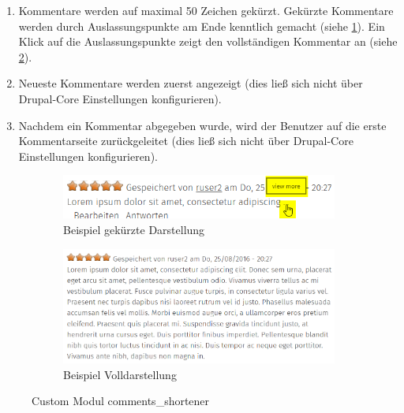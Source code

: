 \begin{enumerate}
	\item Kommentare werden auf maximal 50 Zeichen gekürzt. Gekürzte Kommentare werden durch Auslassungspunkte am Ende kenntlich gemacht (siehe \cref{fig:example_commentshortener_short}). Ein Klick auf die Auslassungspunkte zeigt den vollständigen Kommentar an (siehe \cref{fig:example_commentshortener_full}).

	\item Neueste Kommentare werden zuerst angezeigt (dies ließ sich nicht über Drupal-Core Einstellungen konfigurieren).

	\item Nachdem ein Kommentar abgegeben wurde, wird der Benutzer auf die erste Kommentarseite zurückgeleitet (dies ließ sich nicht über Drupal-Core Einstellungen konfigurieren).
\end{enumerate}

\begin{figure}[H]
	\centering
	\begin{subfigure}[b]{0.45\textwidth}
		\centering
		\includegraphics[width=0.95\linewidth]{images/example_commentsshortener}
		\caption[]{Beispiel gekürzte Darstellung}
		\label{fig:example_commentshortener_short}
	\end{subfigure}
	\begin{subfigure}[b]{0.45\textwidth}
		\centering
		\includegraphics[width=0.95\linewidth]{images/example_commentsshortener_full}
		\caption[]{Beispiel Volldarstellung}
		\label{fig:example_commentshortener_full}
	\end{subfigure}
	\caption{Custom Modul comments\_shortener}
	\label{fig:example_commentsshortener}
\end{figure}

